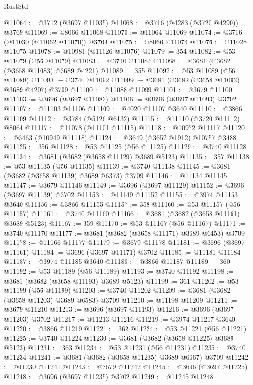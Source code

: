 \begin{lexlean}{RustStd}
\begin{coremodule}
@11064 := @3712 (@3697 @11035)
@11068 := @3716 (@4283 (@3720 @4290)) @3769
@11069 := @8066 @11068
@11070 := @11064 @11069
@11074 := @3716 (@11030 (@11062 @11070)) @3769
@11075 := @8066 @11074
@11076 := @11028 @11075
@11078 := @10981 (@11026 @11076)
@11079 := 354
@11082 := @53 @11079 (@56 @11079)
@11083 := @3740 @11082
@11088 := @3681 (@3682 (@3658 @11083) @3689 @4221)
@11089 := 355
@11092 := @53 @11089 (@56 @11089)
@11093 := @3740 @11092
@11099 := @3681 (@3682 (@3658 @11093) @3689 @4207) @3709
@11100 := @11088 @11099
@11101 := @3679 @11100
@11103 := @3696 (@3697 @11083)
@11106 := @3696 (@3697 @11093) @3702
@11107 := @11103 @11106
@11109 := @4020 @11107 @3640
@11110 := @3866 @11109
@11112 := @3784 (@5126 @6132)
@11115 := @11110 (@3720 @11112) @8064
@11117 := @11078 (@11101 @11115)
@11118 := @10972 @11117
@11120 := @3463 (@10949 @11118)
@11124 := @3649 (@3652 @1912) @10757 @3488
@11125 := 356
@11128 := @53 @11125 (@56 @11125)
@11129 := @3740 @11128
@11134 := @3681 (@3682 (@3658 @11129) @3689 @5123)
@11135 := 357
@11138 := @53 @11135 (@56 @11135)
@11139 := @3740 @11138
@11145 := @3681 (@3682 (@3658 @11139) @3689 @6373) @3709
@11146 := @11134 @11145
@11147 := @3679 @11146
@11149 := @3696 (@3697 @11129)
@11152 := @3696 (@3697 @11139) @3702
@11153 := @11149 @11152
@11155 := @3974 @11153 @3640
@11156 := @3866 @11155
@11157 := 358
@11160 := @53 @11157 (@56 @11157)
@11161 := @3740 @11160
@11166 := @3681 (@3682 (@3658 @11161) @3689 @5123)
@11167 := 359
@11170 := @53 @11167 (@56 @11167)
@11171 := @3740 @11170
@11177 := @3681 (@3682 (@3658 @11171) @3689 @6453) @3709
@11178 := @11166 @11177
@11179 := @3679 @11178
@11181 := @3696 (@3697 @11161)
@11184 := @3696 (@3697 @11171) @3702
@11185 := @11181 @11184
@11187 := @3974 @11185 @3640
@11188 := @3866 @11187
@11189 := 360
@11192 := @53 @11189 (@56 @11189)
@11193 := @3740 @11192
@11198 := @3681 (@3682 (@3658 @11193) @3689 @5123)
@11199 := 361
@11202 := @53 @11199 (@56 @11199)
@11203 := @3740 @11202
@11209 := @3681 (@3682 (@3658 @11203) @3689 @6583) @3709
@11210 := @11198 @11209
@11211 := @3679 @11210
@11213 := @3696 (@3697 @11193)
@11216 := @3696 (@3697 @11203) @3702
@11217 := @11213 @11216
@11219 := @3974 @11217 @3640
@11220 := @3866 @11219
@11221 := 362
@11224 := @53 @11221 (@56 @11221)
@11225 := @3740 @11224
@11230 := @3681 (@3682 (@3658 @11225) @3689 @5123)
@11231 := 363
@11234 := @53 @11231 (@56 @11231)
@11235 := @3740 @11234
@11241 := @3681 (@3682 (@3658 @11235) @3689 @6667) @3709
@11242 := @11230 @11241
@11243 := @3679 @11242
@11245 := @3696 (@3697 @11225)
@11248 := @3696 (@3697 @11235) @3702
@11249 := @11245 @11248

\end{coremodule}
\end{lexlean}
